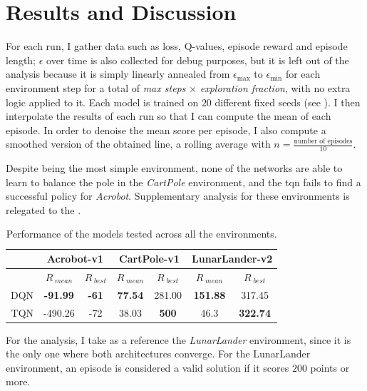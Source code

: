 \section{Results and Discussion}

For each run, I gather data such as loss, Q-values, episode reward and episode length; $\epsilon$ over time is also collected for debug purposes, but it is left out of the analysis because it is simply linearly annealed from $\epsilon_{\max}$ to $\epsilon_{\min}$ for each environment step for a total of \textit{max steps} $\times$ \textit{exploration fraction}, with no extra logic applied to it. Each model is trained on $20$ different fixed seeds (see \textbf{}). I then interpolate the results of each run so that I can compute the mean of each episode. In order to denoise the mean score per episode, I also compute a smoothed version of the obtained line, a rolling average with $n = \frac{\text{number of episodes}}{10}$.

Despite being the most simple environment, none of the networks are able to learn to balance the pole in the \textit{CartPole} environment, and the \acrshort{tqn} fails to find a successful policy for \textit{Acrobot}. Supplementary analysis for these environments is relegated to the \textbf{}. 

\begin{table}[H]
\label{table:results-LunarLander-v2}
\caption{Performance of the models tested across all the environments.}
\centering
\begin{tabular}{@{} r c c c c c c @{}}
\toprule
& \multicolumn{2}{c}{Acrobot-v1} & \multicolumn{2}{c}{CartPole-v1} & \multicolumn{2}{c}{LunarLander-v2} \\
\midrule
& $R_{\;mean}$ & $R_{\;best}$ & $R_{\;mean}$ & $R_{\;best}$ & $R_{\;mean}$ & $R_{\;best}$ \\
\midrule
DQN & \textbf{-91.99} & \textbf{-61} & \textbf{77.54} & 281.00 & \textbf{151.88} & 317.45 \\
TQN & -490.26 & -72 & 38.03 & \textbf{500} & 46.3 & \textbf{322.74} \\
\bottomrule
\end{tabular}
\end{table}

For the analysis, I take as a reference the \textit{LunarLander} environment, since it is the only one where both architectures converge. For the LunarLander environment, an episode is considered a valid solution if it scores $200$ points or more.


